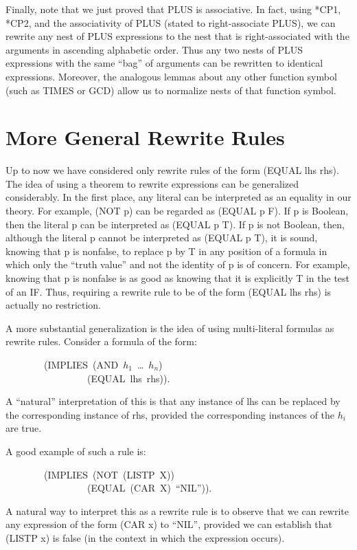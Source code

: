 \documentclass[11pt]{book}
\newenvironment{pubasis}{\begin{flushleft}\ttfamily\small}{\normalsize\rmfamily\end{flushleft}}
\newcommand{\pubdefaulttextsize}{\large}
\begin{document}
Finally, note that we just proved that PLUS is associative.
In fact, using
*CP1, *CP2, and the
associativity of PLUS (stated  to right-associate PLUS), we can rewrite  any nest of PLUS
expressions  to the nest that is right-associated
with the arguments in ascending alphabetic order.  Thus
any two nests of PLUS expressions with the same ``bag'' of arguments
can be rewritten to identical expressions.  Moreover,
the analogous lemmas about any other function symbol
(such as TIMES or GCD) allow us to normalize nests of that function symbol.
\section{More General Rewrite Rules}
\pubdefaulttextsize
Up to now we have  considered only rewrite rules of the form
(EQUAL lhs rhs).  The idea of using a theorem to rewrite expressions can be
generalized considerably.  In the first place, any literal can be
interpreted as an equality in our theory.  For example, (NOT p)
can be regarded as (EQUAL p F).  If p is Boolean, then the literal p
can be interpreted as (EQUAL p T).  If p is not Boolean, then, although
the literal p cannot be interpreted as (EQUAL p T), it is sound, knowing
that p is nonfalse, to replace p by T in any position of a formula in
which only the ``truth value'' and not the identity of p is of concern.
For example, knowing that p is nonfalse is as good as knowing that it is 
explicitly T in the test of an IF.
Thus,
requiring a rewrite rule to be of the form  (EQUAL lhs rhs) is actually no restriction.

A more substantial generalization is the idea of using multi-literal
formulas as rewrite rules.  Consider a formula of the form:
\begin{pubasis}
~~~~~~~~(IMPLIES~(AND~$h_{1}$~\ldots{}~$h_{n}$)\\
~~~~~~~~~~~~~~~~~(EQUAL~lhs~rhs)).\\
\end{pubasis}
A ``natural'' interpretation of this is that any instance of lhs
can be replaced by the corresponding instance of rhs, provided the
corresponding instances of the $h_{i}$ are true.

A good example of such a rule is:
\begin{pubasis}
~~~~~~~~(IMPLIES~(NOT~(LISTP~X))\\
~~~~~~~~~~~~~~~~~(EQUAL~(CAR~X)~``NIL'')).\\
\end{pubasis}
A natural way to interpret this as a rewrite rule is to observe that
we can rewrite any expression of the form (CAR x) to ``NIL'', provided
we can establish that (LISTP x) is false (in the context in which
the expression occurs).
\end{document}
